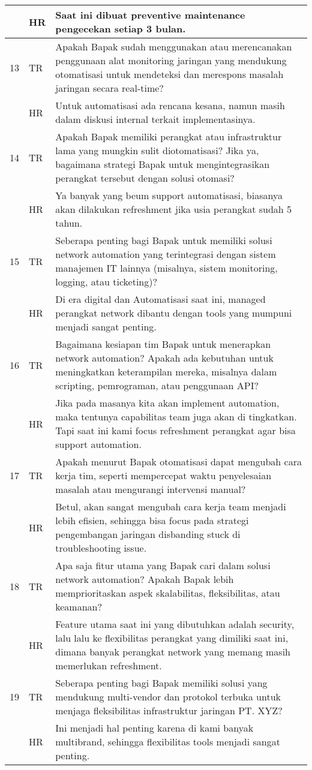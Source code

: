 \begin{longtable}{|p{1cm}|p{1.5cm}|p{11cm}|}
    \hline
    & HR & Saat ini dibuat preventive maintenance pengecekan setiap 3 bulan. \\
    \hline
    13 & TR & Apakah Bapak sudah menggunakan atau merencanakan penggunaan alat monitoring jaringan yang mendukung otomatisasi untuk mendeteksi dan merespons masalah jaringan secara real-time? \\
    \hline
    & HR & Untuk automatisasi ada rencana kesana, namun masih dalam diskusi internal terkait implementasinya. \\
    \hline
    14 & TR & Apakah Bapak memiliki perangkat atau infrastruktur lama yang mungkin sulit diotomatisasi? Jika ya, bagaimana strategi Bapak untuk mengintegrasikan perangkat tersebut dengan solusi otomasi? \\
    \hline
    & HR & Ya banyak yang beum support automatisasi, biasanya akan dilakukan refreshment jika usia perangkat sudah 5 tahun. \\
    \hline
    15 & TR & Seberapa penting bagi Bapak untuk memiliki solusi network automation yang terintegrasi dengan sistem manajemen IT lainnya (misalnya, sistem monitoring, logging, atau ticketing)? \\
    \hline
    & HR & Di era digital dan Automatisasi saat ini, managed perangkat network dibantu dengan tools yang mumpuni menjadi sangat penting. \\
    \hline
    16 & TR & Bagaimana kesiapan tim Bapak untuk menerapkan network automation? Apakah ada kebutuhan untuk meningkatkan keterampilan mereka, misalnya dalam scripting, pemrograman, atau penggunaan API? \\
    \hline
    & HR & Jika pada masanya kita akan implement automation, maka tentunya capabilitas team juga akan di tingkatkan. Tapi saat ini kami focus refreshment perangkat agar bisa support automation. \\
    \hline
    17 & TR & Apakah menurut Bapak otomatisasi dapat mengubah cara kerja tim, seperti mempercepat waktu penyelesaian masalah atau mengurangi intervensi manual? \\
    \hline
    & HR & Betul, akan sangat mengubah cara kerja team menjadi lebih efisien, sehingga bisa focus pada strategi pengembangan jaringan disbanding stuck di troubleshooting issue. \\
    \hline
    18 & TR & Apa saja fitur utama yang Bapak cari dalam solusi network automation? Apakah Bapak lebih memprioritaskan aspek skalabilitas, fleksibilitas, atau keamanan? \\
    \hline
    & HR & Feature utama saat ini yang dibutuhkan adalah security, lalu lalu ke flexibilitas perangkat yang dimiliki saat ini, dimana banyak perangkat network yang memang masih memerlukan refreshment. \\
    \hline
    19 & TR & Seberapa penting bagi Bapak memiliki solusi yang mendukung multi-vendor dan protokol terbuka untuk menjaga fleksibilitas infrastruktur jaringan PT. XYZ? \\
    \hline
    & HR & Ini menjadi hal penting karena di kami banyak multibrand, sehingga flexibilitas tools menjadi sangat penting. \\
    \hline
\end{longtable}

